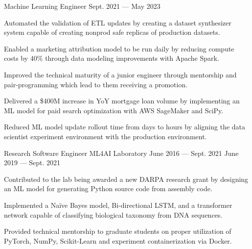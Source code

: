 \begin{cventries}
  \cventry
    {Machine Learning Engineer} %
    {} %
    {} %
    {Sept. 2021 --- May 2023} %
    {
      \vspace{-0.1cm}
      \begin{cvitems} %
        \item Automated the validation of ETL updates by creating a dataset synthesizer system capable of creating nonprod safe replicas of production datasets.
        \item Enabled a marketing attribution model to be run daily by reducing compute costs by 40\% through data modeling improvements with Apache Spark.
        \item Improved the technical maturity of a junior engineer through mentorship and pair-programming which lead to them receiving a promotion.
        \item Delivered a \$400M increase in YoY mortgage loan volume by implementing an ML model for paid search optimization with AWS SageMaker and SciPy.
        \item Reduced ML model update rollout time from days to hours by aligning the data scientist experiment environment with the production environment.
      \end{cvitems}
    }
  \vspace{.2cm}
  \cventry
    {Research Software Engineer} %
    {ML4AI Laboratory} %
    {June 2016 --- Sept. 2021} %
    {June 2019 --- Sept. 2021} %
    {
      \vspace{-0.1cm}
      \begin{cvitems} %
        \item Contributed to the lab being awarded a new DARPA research grant by designing an ML model for generating Python source code from assembly code.
        \item Implemented a Naïve Bayes model, Bi-directional LSTM, and a transformer network capable of classifying biological taxonomy from DNA sequences.
        \item Provided technical mentorship to graduate students on proper utilization of PyTorch, NumPy, Scikit-Learn and experiment containerization via Docker.

\end{cvitems}}
\end{cventries}
